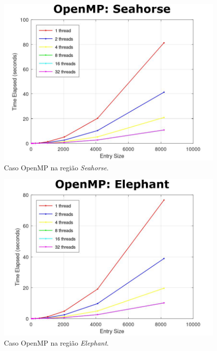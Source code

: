 \documentclass[a4paper, 12pt]{article}
\begin{document}
\begin{figure}[H]
	\centering
	\includegraphics[scale=0.45]{omp_seahorse}
	\caption{Caso OpenMP na região \textit{Seahorse}.}
\end{figure}

\begin{figure}[H]
	\centering
	\includegraphics[scale=0.45]{omp_elephant}
	\caption{Caso OpenMP na região \textit{Elephant}.}
\end{figure}
\end{document}
